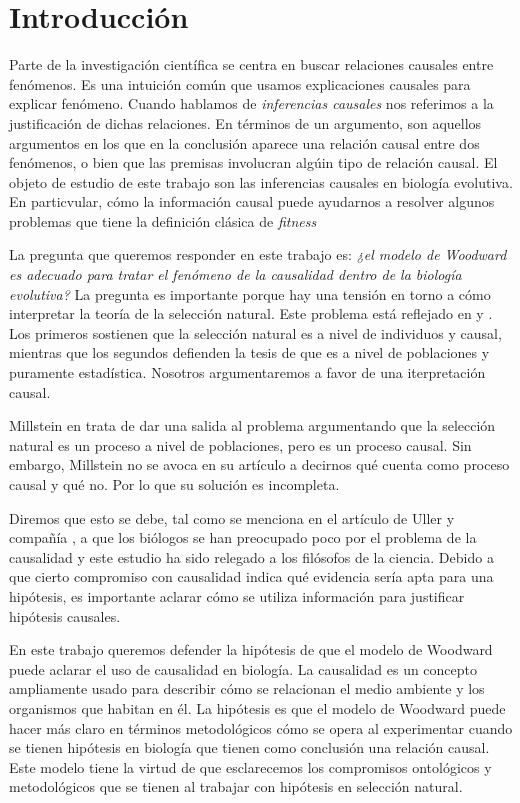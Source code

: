 
\chapter*{Introducción}


\noindent Parte de la investigación científica se centra en buscar relaciones causales entre fenómenos. Es una intuición común que usamos explicaciones causales para explicar fenómeno. Cuando hablamos de \textit{inferencias causales} nos referimos a la justificación de dichas relaciones. En términos de un argumento, son aquellos argumentos en los que en la conclusión aparece una relación causal entre dos fenómenos, o bien que las premisas involucran algúin tipo de relación causal. El objeto de estudio de este trabajo son las inferencias causales en biología evolutiva. En particvular, cómo la información causal puede ayudarnos a resolver algunos problemas que tiene la definición clásica de \emph{fitness}

La pregunta que queremos responder en este trabajo es: \textit{¿el modelo de Woodward es adecuado para tratar el fenómeno de la causalidad dentro de la biología evolutiva?} La pregunta es importante porque hay una tensión en torno a cómo interpretar la teoría de la selección natural. Este problema está reflejado en \cite{Bouchard2004} y \cite{Walsh2002}. Los primeros sostienen que la selección natural es a nivel de individuos y causal, mientras que los segundos defienden la tesis de que es a nivel de poblaciones y puramente estadística. Nosotros argumentaremos a favor de una iterpretación causal.

Millstein en \citeyear{Millstein2006} trata de dar una salida al problema argumentando que la selección natural es un proceso a nivel de poblaciones, pero es un proceso causal. Sin embargo, Millstein no se avoca en su artículo a decirnos qué cuenta como proceso causal y qué no. Por lo que su solución es incompleta.

Diremos que esto se debe, tal como se menciona en el artículo de Uller y compañía \citeyear{Uller2020}, a que los biólogos se han preocupado poco por el problema de la causalidad y este estudio ha sido relegado a los filósofos de la ciencia. Debido a que cierto compromiso con causalidad indica qué evidencia sería apta para una hipótesis, es importante aclarar cómo se utiliza información para justificar hipótesis causales.

En este trabajo queremos defender la hipótesis de que el modelo de Woodward puede aclarar el uso de causalidad en biología. La causalidad es un concepto ampliamente usado para describir cómo se relacionan el medio ambiente y los organismos que habitan en él. La hipótesis es que el modelo de Woodward puede hacer más claro en términos metodológicos cómo se opera al experimentar cuando se tienen hipótesis en biología que tienen como conclusión una relación causal. Este modelo tiene la virtud de que esclarecemos los compromisos ontológicos y metodológicos que se tienen al trabajar con hipótesis en selección natural.


